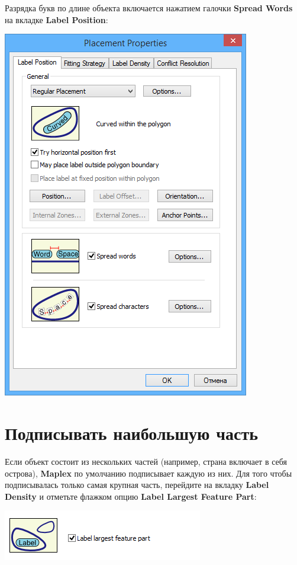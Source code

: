 \documentclass[]{book}
\theoremstyle{definition}
\theoremstyle{definition}
\theoremstyle{definition}
\theoremstyle{remark}
\begin{document}
Разрядка букв по длине объекта включается нажатием галочки
\textbf{Spread Words} на вкладке \textbf{Label Position}:

\includegraphics{images/Appendix/image47.png}

\hypertarget{--}{%
\section{Подписывать наибольшую часть}\label{--}}

Если объект состоит из нескольких частей (например, страна включает в
себя острова), \textbf{Maplex} по умолчанию подписывает каждую из них.
Для того чтобы подписывалась только самая крупная часть, перейдите на
вкладку \textbf{Label Density} и отметьте флажком опцию \textbf{Label
Largest Feature Part}:

\includegraphics{images/Appendix/image48.png}
\end{document}
